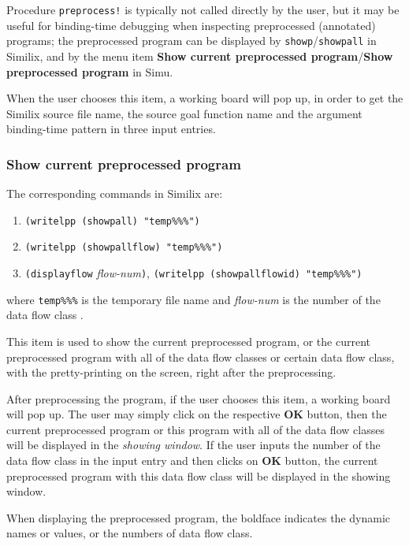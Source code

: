 \begin{sloppypar}
\begin{enumerate}
\end{enumerate}

   Procedure {\tt preprocess!} is typically not called directly by the
user, but it may be useful for binding-time debugging when inspecting
preprocessed (annotated) programs; the preprocessed program can be
displayed by {\tt showp}/{\tt showpall} in Similix, and by the menu
item {\bf Show current preprocessed program}/{\bf Show preprocessed
program} in Simu.

   When the user chooses this item, a working board will pop up, in
order to get the Similix source file name, the source goal function
name and the argument binding-time pattern in three input entries.


\subsubsection{Show current preprocessed program}
\label{subsubsec-show-cur-pre-prog}

The corresponding commands in Similix are:

\begin{enumerate}
\item {\tt (writelpp (showpall) "temp\%\%\%")}
\item {\tt (writelpp (showpallflow) "temp\%\%\%")}
\item {\tt (displayflow} {\it flow-num}{\tt )},
      {\tt (writelpp (showpallflowid) "temp\%\%\%")}
\end{enumerate}

\noindent where {\tt temp\%\%\%} is the temporary file name and {\it flow-num}
is the number of the data flow class \cite{BondorfJoergensen:93:jfp}.

   This item is used to show the current preprocessed program, or the
current preprocessed program with all of the data flow classes or
certain data flow class, with the pretty-printing on the screen, right
after the preprocessing.
   
After preprocessing the program, if the user chooses this item, a
working board will pop up.  The user may simply click on the
respective {\bf OK} button, then the current preprocessed program or
this program with all of the data flow classes will be displayed in
the {\it showing window}. If the user inputs the number of the data
flow class in the input entry and then clicks on {\bf OK} button, the
current preprocessed program with this data flow class will be
displayed in the showing window.

   When displaying the preprocessed program, the boldface indicates
the dynamic names or values, or the numbers of data flow class.



\end{sloppypar}
